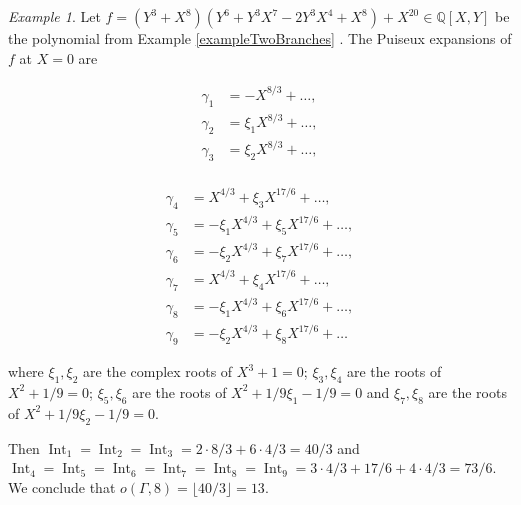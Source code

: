 \documentclass[a4paper,11pt]{amsart}%
\theoremstyle{definition}
\theoremstyle{plain}
\theoremstyle{remark}
\newtheorem{example}[defn]{Example}
\DeclareMathOperator{\Int}{Int}
\begin{document}
\begin{example}
\label{exampleTwoBranches-int} 
Let $f = (Y^3+X^8)(Y^6 + Y^3X^7 - 2Y^3X^4 + X^8) + X^{20}
\in{\mathbb{Q}}[X,Y]$ be the polynomial from Example \ref{exampleTwoBranches}%
. The Puiseux expansions of $f$ at $X = 0$ are 
\begin{multicols}{3}
\noindent
\begin{align*}
\gamma_{1} &= -X^{8/3}+ \dots, \\
\gamma_{2} &= \xi_{1}X^{8/3} + \dots, \\
\gamma_{3} &= \xi_{2}X^{8/3} + \dots, \\
\end{align*}
\end{multicols}
\vspace{-1cm}
\begin{multicols}{2}
\noindent
\begin{align*}
\gamma_{4} &= X^{4/3} + \xi_3 X^{17/6} + \dots, \\
\gamma_{5} &= -\xi_{1}X^{4/3} + \xi_{5} X^{17/6} + \dots, \\
\gamma_{6} &= -\xi_{2}X^{4/3} + \xi_{7} X^{17/6} + \dots, \\
\gamma_{7} &= X^{4/3} + \xi_4 X^{17/6} + \dots, \\
\gamma_{8} &= -\xi_{1}X^{4/3} + \xi_{6} X^{17/6} + \dots, \\
\gamma_{9} &= -\xi_{2}X^{4/3} + \xi_{8} X^{17/6} + \dots
\end{align*}
\end{multicols}
\noindent where $\xi_{1}, \xi_{2}$ are the complex roots of $X^{3} + 1 = 0$;
$\xi_{3}, \xi_{4}$ are the roots of $X^{2} + 1/9 = 0$;  
$\xi_{5}, \xi_{6}$ are the roots of $X^{2} + 1/9 \xi_{1} - 1/9 = 0$ and
$\xi_{7}, \xi_{8}$ are the roots of $X^{2} + 1/9 \xi_{2} - 1/9 = 0$.

Then $\Int_{1} = \Int_{2} = \Int_{3} = 2 \cdot 8/3 + 6 \cdot 4/3 = 40/3$ and
$\Int_{4} = \Int_{5} = \Int_{6} = \Int_{7} = \Int_{8} = \Int_{9} = 3 \cdot 4/3 + 17/6 + 4 \cdot 4/3 = 73 / 6$.
We conclude that $o(\varGamma,8) = \lfloor 40/3 \rfloor = 13$.
\end{example}
\end{document}
